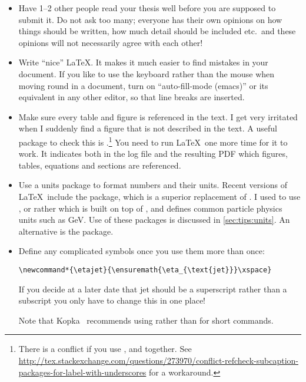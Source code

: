 \begin{itemize}
\item Have 1--2 other people read your thesis well before you are
  supposed to submit it. Do not ask too many; everyone has their own
  opinions on how things should be written, how much detail should be
  included etc.\ and these opinions will not necessarily agree with
  each other!

\item Write \enquote{nice} \LaTeX. It makes it much easier to find mistakes
  in your document. If you like to use the keyboard rather than the
  mouse when moving round in a document, turn on \enquote{auto-fill-mode
  (emacs)} or its equivalent in any other editor, so
  that line breaks are inserted.

\item Make sure every table and figure is referenced in the text. I
  get very irritated when I suddenly find a figure that is not
  described in the text. A useful package to check this is
  .\footnote{%
  There is a conflict if you use ,  and  together.
  See \url{http://tex.stackexchange.com/questions/273970/conflict-refcheck-subcaption-packages-for-label-with-underscores} for a workaround.}
  You need to run \LaTeX\ one more time for it to
  work. It indicates both in the log file and the resulting PDF which
  figures, tables, equations and sections are referenced.

\item Use a units package to format numbers and their units. Recent
  versions of \LaTeX\ include the  package, which
  is a superior replacement of . I used to
  use , or rather  which is
  built on top of , and defines common particle
  physics units such as \si{\GeV}. Use of these packages is
  discussed in \cref{sec:tips:units}.
  An alternative is the  package.

\item Define any complicated symbols once you use them more than
  once:
\begin{verbatim}
\newcommand*{\etajet}{\ensuremath{\eta_{\text{jet}}}\xspace}
\end{verbatim}
  If you decide at a later date that jet should be a superscript
  rather than a subscript you only have to change this in one place!

  Note that Kopka~\cite{kopka04}
  recommends using  rather than 
  for short commands.


\end{itemize}
